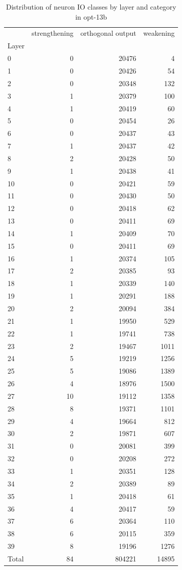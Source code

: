 \begin{table}
\caption{Distribution of neuron IO classes by layer and category in opt-13b}
\label{tab:opt-13b}
\begin{tabular}{lrrr}
 & strengthening & orthogonal output & weakening \\
Layer &  &  &  \\
0 & 0 & 20476 & 4 \\
1 & 0 & 20426 & 54 \\
2 & 0 & 20348 & 132 \\
3 & 1 & 20379 & 100 \\
4 & 1 & 20419 & 60 \\
5 & 0 & 20454 & 26 \\
6 & 0 & 20437 & 43 \\
7 & 1 & 20437 & 42 \\
8 & 2 & 20428 & 50 \\
9 & 1 & 20438 & 41 \\
10 & 0 & 20421 & 59 \\
11 & 0 & 20430 & 50 \\
12 & 0 & 20418 & 62 \\
13 & 0 & 20411 & 69 \\
14 & 1 & 20409 & 70 \\
15 & 0 & 20411 & 69 \\
16 & 1 & 20374 & 105 \\
17 & 2 & 20385 & 93 \\
18 & 1 & 20339 & 140 \\
19 & 1 & 20291 & 188 \\
20 & 2 & 20094 & 384 \\
21 & 1 & 19950 & 529 \\
22 & 1 & 19741 & 738 \\
23 & 2 & 19467 & 1011 \\
24 & 5 & 19219 & 1256 \\
25 & 5 & 19086 & 1389 \\
26 & 4 & 18976 & 1500 \\
27 & 10 & 19112 & 1358 \\
28 & 8 & 19371 & 1101 \\
29 & 4 & 19664 & 812 \\
30 & 2 & 19871 & 607 \\
31 & 0 & 20081 & 399 \\
32 & 0 & 20208 & 272 \\
33 & 1 & 20351 & 128 \\
34 & 2 & 20389 & 89 \\
35 & 1 & 20418 & 61 \\
36 & 4 & 20417 & 59 \\
37 & 6 & 20364 & 110 \\
38 & 6 & 20115 & 359 \\
39 & 8 & 19196 & 1276 \\
Total & 84 & 804221 & 14895 \\
\end{tabular}
\end{table}
